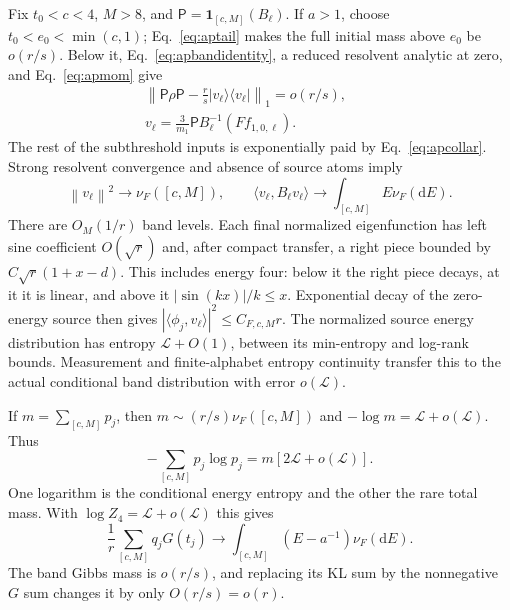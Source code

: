 \documentclass[aps,pra,reprint,superscriptaddress,longbibliography]{revtex4-2}
\newcommand{\dd}{\mathrm d}
\newcommand{\norm}[1]{\left\lVert#1\right\rVert}
\newcommand{\ket}[1]{\lvert#1\rangle}
\newcommand{\bra}[1]{\langle#1\rvert}
\newcommand{\ip}[2]{\langle#1,#2\rangle}
\newcommand{\one}{\mathbf 1}
\begin{document}
Fix $t_0<c<4$, $M>8$, and $\mathsf P=\one_{[c,M]}(B_\ell)$.
If $a>1$, choose $t_0<e_0<\min(c,1)$; Eq.~\eqref{eq:aptail}
makes the full initial mass above $e_0$ be $o(r/s)$. Below it,
Eq.~\eqref{eq:apbandidentity}, a reduced resolvent analytic at zero,
and Eq.~\eqref{eq:apmom} give
\begin{equation}
 \begin{gathered}
 \left\|\mathsf P\rho\mathsf P-\frac r s\ket{v_\ell}\bra{v_\ell}
                \right\|_1=o(r/s),\qquad\\
 v_\ell=\frac3{m_1}\mathsf P B_\ell^{-1}(Ff_{1,0,\ell}).
 \end{gathered}                                         \label{eq:aprankband}
\end{equation}
The rest of the subthreshold inputs is exponentially paid by
Eq.~\eqref{eq:apcollar}. Strong resolvent convergence and absence of
source atoms imply
\begin{equation}
 \norm{v_\ell}^2\to\nu_F([c,M]),\qquad
 \ip{v_\ell}{B_\ell v_\ell}\to\int_{[c,M]}E\nu_F(\dd E). \label{eq:apbandmoments}
\end{equation}
There are $O_M(1/r)$ band levels. Each final normalized eigenfunction
has left sine coefficient $O(\sqrt r)$ and, after compact transfer,
a right piece bounded by $C\sqrt r(1+x-d)$. This includes energy
four: below it the right piece decays, at it it is linear, and above
it $|\sin(kx)|/k\le x$. Exponential decay of the zero-energy source
then gives $|\ip{\phi_j}{v_\ell}|^2\le C_{F,c,M}r$.
The normalized source energy distribution has entropy
$\mathcal L+O(1)$, between its min-entropy and log-rank bounds.
Measurement and finite-alphabet entropy continuity transfer this
to the actual conditional band distribution with error $o(\mathcal L)$.

If $m=\sum_{[c,M]}p_j$, then $m\sim(r/s)\nu_F([c,M])$ and
$-\log m=\mathcal L+o(\mathcal L)$. Thus
\begin{equation}
 -\sum_{[c,M]}p_j\log p_j=m[2\mathcal L+o(\mathcal L)].   \label{eq:aptwologs}
\end{equation}
One logarithm is the conditional energy entropy and the other the
rare total mass. With $\log Z_4=\mathcal L+o(\mathcal L)$ this gives
\begin{equation}
 \frac1r\sum_{[c,M]}q_jG(t_j)
            \to\int_{[c,M]}(E-a^{-1})\nu_F(\dd E).       \label{eq:apbandentropy}
\end{equation}
The band Gibbs mass is $o(r/s)$, and replacing its KL sum by the
nonnegative $G$ sum changes it by only $O(r/s)=o(r)$.
\end{document}
